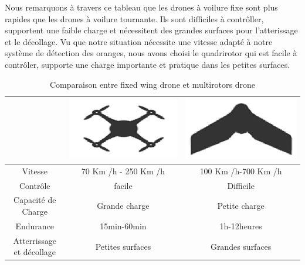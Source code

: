 	Nous remarquons à travers ce tableau que les drones à voilure fixe sont plus rapides que les drones à voilure tournante. Ils sont difficiles à contrôller, supportent une faible charge et nécessitent des grandes surfaces pour l'atterissage et le décollage.
    Vu que notre situation nécessite une vitesse adapté à notre système de détection des oranges, nous avons choisi le quadrirotor qui est facile à contrôler, supporte une charge importante et pratique dans les petites surfaces.      
	\begin{table}[H]
		\begin{center}
			\caption{Comparaison entre fixed wing drone et multirotors drone	 }
			\begin{tabular}{|c|c|c|}
				\hline
				\centering
				& 
				\includegraphics[scale=0.2]{Images/Quadrirotor}
				&
				\includegraphics[scale=0.2]{Images/Ailed fixed}\\
				
				\hline
				Vitesse & 70 Km /h - 250 Km /h & 100 Km /h-700 Km /h  \\
				\hline
				Contrôle	& facile &	Difficile \\
				\hline
				Capacité de Charge &	Grande charge &	Petite charge \\
				\hline
				Endurance &	15min-60min & 1h-12heures \\
				\hline
				Atterrissage et décollage &	Petites surfaces &	Grandes surfaces \\
				\hline
			\end{tabular}
		\end{center}
	\end{table}	
